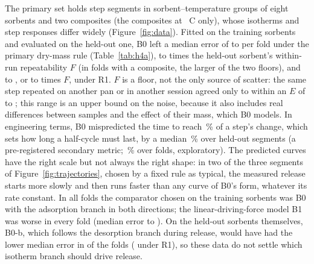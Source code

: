 \documentclass[12pt]{article}
\begin{document}
The primary set holds  step segments in
 sorbent--temperature groups of eight sorbents and two composites (the composites at
~\textdegree C only), whose isotherms and step responses
differ widely (Figure~\ref{fig:data}). Fitted on the training sorbents and evaluated on the held-out one, B0 left a
median error of  to  per fold under the primary dry-mass rule (Table~\ref{tab:h4a}),
 to  times the held-out sorbent's within-run repeatability $F$ (in folds with a
composite, the larger of the two floors), and  to , or
 to  times $F$, under R1. $F$ is a floor, not the only source of scatter: the same step repeated on
another pan or in another session agreed only to within an $E$ of  to ;
this range is an
upper bound on the noise, because it also includes real differences between samples and the effect of their mass, which B0 models. In engineering terms, B0 mispredicted the time to reach \,\%
of a step's change, which sets how long a half-cycle must last, by a median \,\% over held-out segments (a pre-registered secondary metric; \,\% over folds,
exploratory). The predicted curves have the right scale but not always the right shape: in two of the three
segments of Figure~\ref{fig:trajectories}, chosen by a fixed rule as typical, the measured release starts more slowly
and then runs faster than any curve of B0's form, whatever its rate constant. In all  folds the comparator chosen on the training sorbents was B0
with the adsorption branch in both directions; the linear-driving-force model B1 was worse in every fold (median error
 to ). On the held-out sorbents themselves, B0-b, which follows the desorption
branch during release, would have had the lower median error in  of the  folds
( under R1), so these data do not settle which isotherm branch should drive release.
\end{document}
